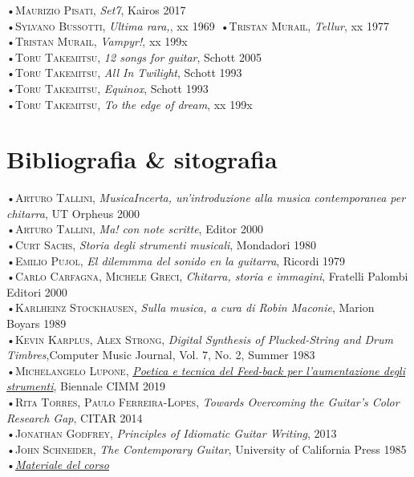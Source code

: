 \documentclass[oneside]{article}
\begin{document}
\begin{multicols*}{2}
•\textsc{\textsf {Maurizio Pisati}}, \emph{Set7}, Kairos 2017\\
•\textsc{\textsf {Sylvano Bussotti}}, \emph{Ultima rara,}, xx 1969\
•\textsc{\textsf {Tristan Murail}}, \emph{Tellur}, xx 1977\\
•\textsc{\textsf {Tristan Murail}}, \emph{Vampyr!}, xx 199x\\
•\textsc{\textsf {Toru Takemitsu}}, \emph{12 songs for guitar}, Schott 2005\\
•\textsc{\textsf {Toru Takemitsu}}, \emph{All In Twilight}, Schott 1993\\
•\textsc{\textsf {Toru Takemitsu}}, \emph{Equinox}, Schott 1993\\
•\textsc{\textsf {Toru Takemitsu}}, \emph{To the edge of dream}, xx 199x\\


\vfill\null
\columnbreak


\section{ Bibliografia \& sitografia}
•\textsc{\textsf {Arturo Tallini}}, \emph{MusicaIncerta, un'introduzione alla musica contemporanea per chitarra}, UT Orpheus 2000\\
•\textsc{\textsf {Arturo Tallini}}, \emph{Ma! con note scritte}, Editor 2000\\
•\textsc{\textsf {Curt Sachs}}, \emph{Storia degli strumenti musicali}, Mondadori 1980\\
•\textsc{\textsf {Emilio Pujol}}, \emph{El dilemmma del sonido en la guitarra}, Ricordi 1979\\
•\textsc{\textsf {Carlo Carfagna, Michele Greci}}, \emph{Chitarra, storia e immagini}, Fratelli Palombi Editori 2000\\
•\textsc{\textsf {Karlheinz Stockhausen}}, \emph{Sulla musica, a cura di Robin Maconie}, Marion Boyars 1989\\
•\textsc{\textsf {Kevin Karplus, Alex Strong}}, \emph{Digital Synthesis of Plucked-String and Drum Timbres},Computer Music Journal, Vol. 7, No. 2,
Summer 1983\\
•\textsc{\textsf {Michelangelo Lupone}}, \emph{\href{https://www.youtube.com/watch?v=btioUhxSoCM}{Poetica e tecnica del Feed-back per l’aumentazione degli strumenti}}, Biennale CIMM 2019\\
•\textsc{\textsf {Rita Torres, Paulo Ferreira-Lopes}}, \emph{Towards Overcoming the Guitar's Color Research Gap}, CITAR 2014\\
•\textsc{\textsf {Jonathan Godfrey}}, \emph{Principles of Idiomatic Guitar Writing},  2013\\
•\textsc{\textsf {John Schneider}}, \emph{The Contemporary Guitar},  University of California Press 1985\\
•\emph{\href{https://github.com/SMERM/BN-Tedesco/tree/master/COME-02}{Materiale del corso}}


\end{multicols*}
\end{document}
